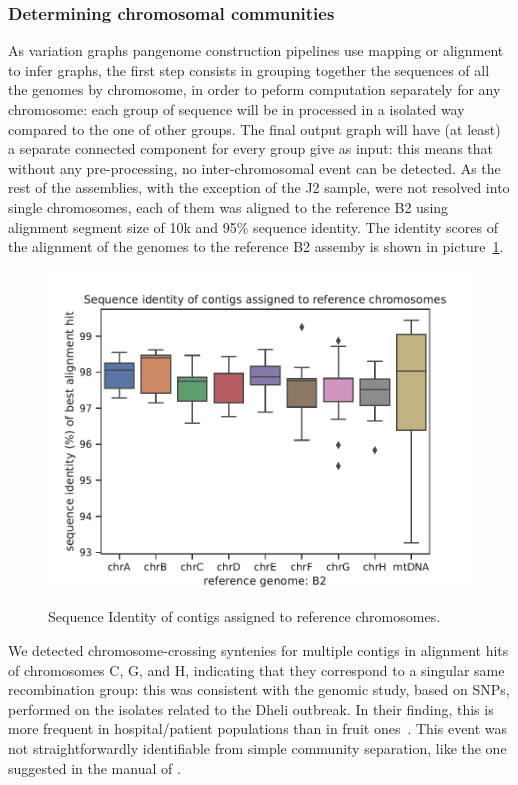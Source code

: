 \subsubsection{Determining chromosomal communities} 
As variation graphs pangenome construction pipelines use mapping or alignment to infer graphs, the first step consists in grouping together the sequences of all the genomes by chromosome, in order to peform computation separately for any chromosome: each group of sequence will be in processed in a isolated way compared to the one of other groups. The final output graph will have (at least) a separate connected component for every group give as input: this means that without any pre-processing, no inter-chromosomal event can be detected.  
As the rest of the assemblies, with the exception of the J2 sample, were not resolved into single chromosomes, each of them was aligned to the reference B2 using \wfmash alignment segment size of 10k and 95\% sequence identity. The identity scores of the alignment of the genomes to the reference B2 assemby is shown in picture~\ref{fig:lodelo_alignment_scores}.
\begin{figure}[t]
	\centering
	\includegraphics[width=.8\linewidth]{figures/Alignment_scores.pdf}
	\label{fig:lodelo_alignment_scores}
	\caption{Sequence Identity of contigs assigned to reference chromosomes.}
\end{figure}
We detected chromosome-crossing syntenies for multiple contigs in alignment hits of chromosomes C, G, and H, indicating that they correspond to a singular same recombination group: this was consistent with the genomic study, based on SNPs, performed on the isolates related to the Dheli outbreak. In their finding, this is more frequent in hospital/patient populations than in fruit ones~\cite{lodelo_india}. This event was not straightforwardly identifiable from simple community separation, like the one suggested in the manual of \pggb. 
